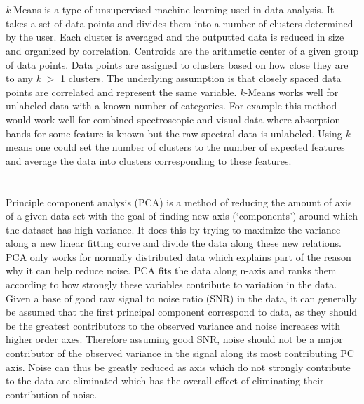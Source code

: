 \documentclass[titlepage]{article}
\begin{document}
\section{}
\setlength{\parindent}{20pt}
\par \emph{k}-Means is a type of unsupervised machine learning used in data analysis. 
It takes a set of data points and divides them into a number of clusters 
determined by the user. Each cluster is averaged and the outputted data is 
reduced in size and organized by correlation. Centroids are the arithmetic center 
of a given group of data points. Data points are assigned to clusters based on 
how close they are to any \emph{k} $>$ 1 clusters. The underlying assumption is that closely spaced 
data points are correlated and represent the same variable. \emph{k}-Means works well for unlabeled data 
with a known number of categories. For example this method would work well for combined spectroscopic 
and visual data where absorption bands for some feature is known but the raw spectral data is unlabeled. 
Using \emph{k}-means one could set the number of clusters to the number of expected features and average the data 
into clusters corresponding to these features. 

\section{}
\setlength{\parindent}{20pt}
\par Principle component analysis (PCA) is a method of reducing the amount of axis of a given data set with the goal of finding new axis (`components') around which the dataset has high variance. It does this by trying to maximize the variance along a new linear fitting curve and divide the data along these new relations. PCA only works for normally distributed data which explains part of the reason why it can help reduce noise. PCA fits the data along n-axis and ranks them according to how strongly these variables contribute to variation in the data. Given a base of good raw signal to noise ratio (SNR) in the data, it can generally be assumed that the first principal component correspond to data, as they should be the greatest contributors to the observed variance and noise increases with higher order axes. Therefore assuming good SNR, noise should not be a major contributor of the observed variance in the signal along its most contributing PC axis. Noise can thus be greatly reduced as axis which do not strongly contribute to the data are eliminated which has the overall effect of eliminating their contribution of noise. 
\end{document}
